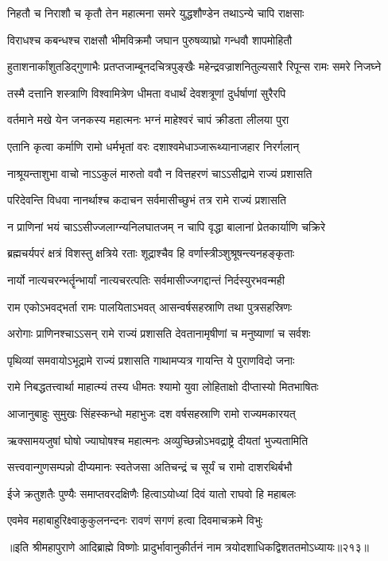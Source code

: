 \twolineshloka
{निहतौ च निराशौ च कृतौ तेन महात्मना}
{समरे युद्धशौण्डेन तथाऽन्ये चापि राक्षसाः} %

\twolineshloka
{विराधश्च कबन्धश्च राक्षसौ भीमविक्रमौ}
{जघान पुरुषव्याघ्रो गन्धवौ शापमोहितौ} %

\twolineshloka
{हुताशनार्कांशुतडिद्‌गुणाभैः प्रतप्तजाम्बूनदचित्रपुङ्खैः}
{महेन्द्रवज्राशनितुल्यसारै रिपून्स रामः समरे निजघ्ने} %

\twolineshloka
{तस्मै दत्तानि शस्त्राणि विश्वामित्रेण धीमता}
{वधार्थं देवशत्रूणां दुर्धर्षाणां सुरैरपि} %

\twolineshloka
{वर्तमाने मखे येन जनकस्य महात्मनः}
{भग्नं माहेश्वरं चापं क्रीडता लीलया पुरा} %

\twolineshloka
{एतानि कृत्वा कर्माणि रामो धर्मभृतां वरः}
{दशाश्वमेधाञ्जारूथ्यानाजहार निरर्गलान्} %

\twolineshloka
{नाश्रूयन्ताशुभा वाचो नाऽऽकुलं मारुतो ववौ}
{न वित्तहरणं चाऽऽसीद्रामे राज्यं प्रशासति} %

\twolineshloka
{परिदेवन्ति विधवा नानर्थाश्च कदाचन}
{सर्वमासीच्छुभं तत्र रामे राज्यं प्रशासति} %

\twolineshloka
{न प्राणिनां भयं चाऽऽसीज्जलाग्न्यनिलघातजम्}
{न चापि वृद्धा बालानां प्रेतकार्याणि चक्रिरे} %

\twolineshloka
{ब्रह्मचर्यपरं क्षत्रं विशस्तु क्षत्रिये रताः}
{शूद्राश्चैव हि वर्णास्त्रीञ्शुश्रूषन्त्यनहङ्कृताः} %

\twolineshloka
{नार्यो नात्यचरन्भर्तॄन्भार्यां नात्यचरत्पतिः}
{सर्वमासीज्जगद्दान्तं निर्दस्युरभवन्मही} %

\twolineshloka
{राम एकोऽभवद्भर्ता रामः पालयिताऽभवत्}
{आसन्वर्षसहस्राणि तथा पुत्रसहस्रिणः} %

\twolineshloka
{अरोगाः प्राणिनश्चाऽऽसन् रामे राज्यं प्रशासति}
{देवतानामृषीणां च मनुष्याणां च सर्वशः} %

\twolineshloka
{पृथिव्यां समवायोऽभूद्रामे राज्यं प्रशासति}
{गाथामप्यत्र गायन्ति ये पुराणविदो जनाः} %

\twolineshloka
{रामे निबद्धतत्त्वार्था माहात्म्यं तस्य धीमतः}
{श्यामो युवा लोहिताक्षो दीप्तास्यो मितभाषितः} %

\twolineshloka
{आजानुबाहुः सुमुखः सिंहस्कन्धो महाभुजः}
{दश वर्षसहस्राणि रामो राज्यमकारयत्} %

\twolineshloka
{ऋक्सामयजुषां घोषो ज्याघोषश्च महात्मनः}
{अव्युच्छिन्नोऽभवद्राष्ट्रे दीयतां भुज्यतामिति} %

\twolineshloka
{सत्त्ववान्गुणसम्पन्नो दीप्यमानः स्वतेजसा}
{अतिचन्द्रं च सूर्यं च रामो दाशरथिर्बभौ} %

\twolineshloka
{ईजे क्रतुशतैः पुण्यैः समाप्तवरदक्षिणैः}
{हित्वाऽयोध्यां दिवं यातो राघवो हि महाबलः} %

\twolineshloka
{एवमेव महाबाहुरिक्ष्वाकुकुलनन्दनः}
{रावणं सगणं हत्वा दिवमाचक्रमे विभुः} %

॥इति श्रीमहापुराणे आदिब्राह्मे विष्णोः प्रादुर्भावानुकीर्तनं नाम त्रयोदशाधिकद्विशततमोऽध्यायः॥२१३॥
